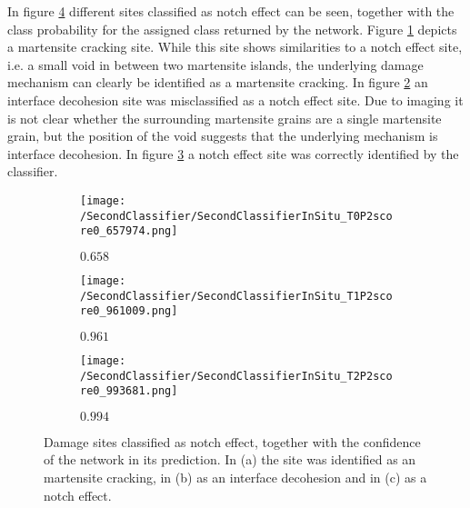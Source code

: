 In figure \ref{fig:InSituNotchEffectSamples} different sites classified as notch effect can be seen, together with the class probability for the assigned class returned by the network. Figure \ref{sub:InSituNotchEffectSamplesM} depicts a martensite cracking site. While this site shows similarities to a notch effect site, i.e. a small void in between two martensite islands, the underlying damage mechanism can clearly be identified as a martensite cracking. In figure \ref{sub:InSituNotchEffectSamplesI} an interface decohesion site was misclassified as a notch effect site. Due to imaging it is not clear whether the surrounding martensite grains are a single martensite grain, but the position of the void suggests that the underlying mechanism is interface decohesion. In figure \ref{sub:InSituNotchEffectSamplesN} a notch effect site was correctly identified by the classifier.

\begin{figure}[H]
\centering
\begin{subfigure}{0.3\textwidth}
\texttt{[image: /SecondClassifier/SecondClassifierInSitu\_T0P2score0\_657974.png]}
\caption{$0.658$}
\label{sub:InSituNotchEffectSamplesM}
\end{subfigure}
\begin{subfigure}{0.3\textwidth}
\texttt{[image: /SecondClassifier/SecondClassifierInSitu\_T1P2score0\_961009.png]}
\caption{$0.961$}
\label{sub:InSituNotchEffectSamplesI}
\end{subfigure}
\begin{subfigure}{0.3\textwidth}
\texttt{[image: /SecondClassifier/SecondClassifierInSitu\_T2P2score0\_993681.png]}
\caption{$0.994$}
\label{sub:InSituNotchEffectSamplesN}
\end{subfigure}
\caption{Damage sites classified as notch effect, together with the confidence of the network in its prediction. In (a) the site was identified as an martensite cracking, in (b) as an interface decohesion and in (c) as a notch effect. }
\label{fig:InSituNotchEffectSamples}
\end{figure}

